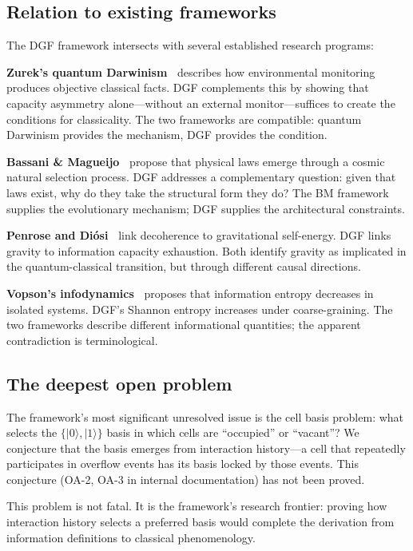 \documentclass[12pt]{article}
\begin{document}
\subsection{Relation to existing frameworks}

The DGF framework intersects with several established research programs:

\textbf{Zurek's quantum Darwinism~\cite{Zurek2009}} describes how environmental monitoring produces objective classical facts. DGF complements this by showing that capacity asymmetry alone---without an external monitor---suffices to create the conditions for classicality. The two frameworks are compatible: quantum Darwinism provides the mechanism, DGF provides the condition.

\textbf{Bassani \& Magueijo~\cite{Bassani2025}} propose that physical laws emerge through a cosmic natural selection process. DGF addresses a complementary question: given that laws exist, why do they take the structural form they do? The BM framework supplies the evolutionary mechanism; DGF supplies the architectural constraints.

\textbf{Penrose and Di\'osi~\cite{Penrose1996,Diosi1989}} link decoherence to gravitational self-energy. DGF links gravity to information capacity exhaustion. Both identify gravity as implicated in the quantum-classical transition, but through different causal directions.

\textbf{Vopson's infodynamics~\cite{Vopson2023}} proposes that information entropy decreases in isolated systems. DGF's Shannon entropy increases under coarse-graining. The two frameworks describe different informational quantities; the apparent contradiction is terminological.

\subsection{The deepest open problem}

The framework's most significant unresolved issue is the cell basis problem: what selects the $\{|0\rangle,|1\rangle\}$ basis in which cells are ``occupied'' or ``vacant''? We conjecture that the basis emerges from interaction history---a cell that repeatedly participates in overflow events has its basis locked by those events. This conjecture (OA-2, OA-3 in internal documentation) has not been proved.

This problem is not fatal. It is the framework's research frontier: proving how interaction history selects a preferred basis would complete the derivation from information definitions to classical phenomenology.
\end{document}
